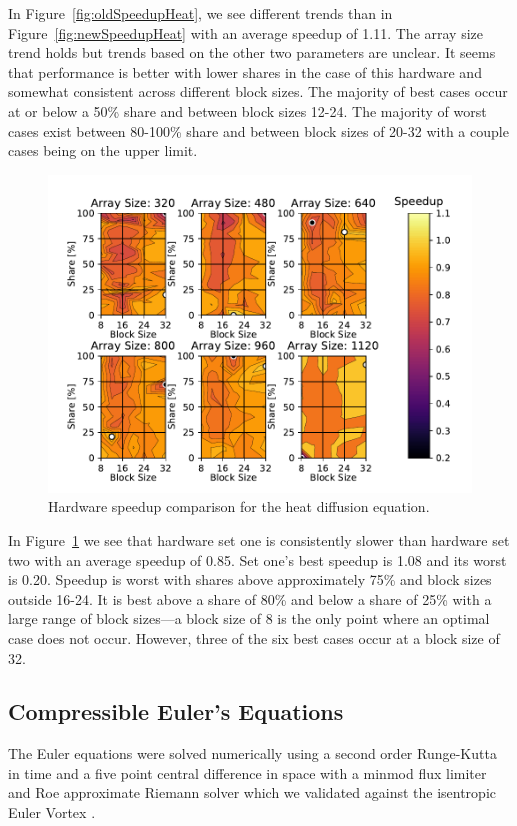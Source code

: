 \documentclass[review]{elsarticle}
\begin{document}
In Figure~\ref{fig:oldSpeedupHeat}, we see different trends than in Figure~\ref{fig:newSpeedupHeat} with an average speedup of 1.11. The array size trend holds but trends based on the other two parameters are unclear. It seems that performance is better with lower shares in the case of this hardware and somewhat consistent across different block sizes. The majority of best cases occur at or below a 50\% share and between block sizes 12-24. The majority of worst cases exist between 80-100\% share and between block sizes of 20-32 with a couple cases being on the upper limit.

\begin{figure}[htb!]
    \centering
    \includegraphics[scale=0.7]{figs/hardwareSpeedupheat.pdf}
    \caption{Hardware speedup comparison for the heat diffusion equation.}
    \label{fig:heatHardwareComp}
\end{figure}

In Figure~\ref{fig:heatHardwareComp} we see that hardware set one is consistently slower than hardware set two with an average speedup of 0.85. Set one's best speedup is 1.08 and its worst is 0.20. Speedup is worst with shares above approximately 75\% and block sizes outside 16-24. It is best above a share of 80\% and below a share of 25\% with a large range of block sizes---a block size of 8 is the only point where an optimal case does not occur. However, three of the six best cases occur at a block size of 32.

\subsection{Compressible Euler's Equations}
\label{eulerVortexResults}
The Euler equations were solved numerically using a second order Runge-Kutta in time and a five point central difference in space with a minmod flux limiter and Roe approximate Riemann solver which we validated against the isentropic Euler Vortex \cite{SpiegelAMethods}.
\end{document}
